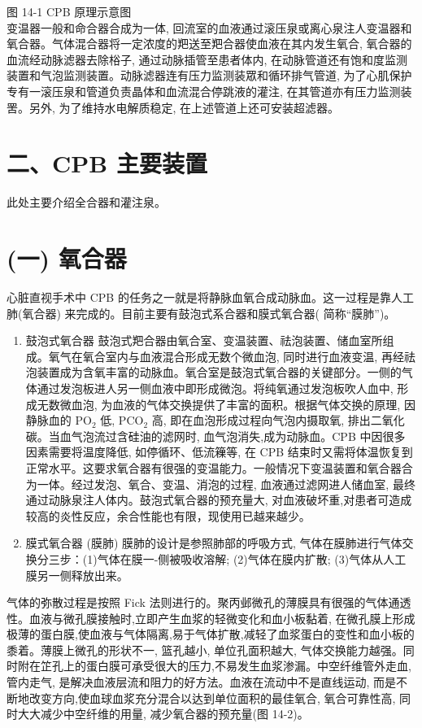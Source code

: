 \documentclass[10pt]{article}
\begin{document}
图 14-1 CPB 原理示意图\\
变温器一般和命合器合成为一体, 回流室的血液通过滚压泉或离心泉注人变温器和氧合器。气体混合器将一定浓度的羓送至羓合器使血液在其内发生氧合, 氧合器的血流经动脉滤器去除㭲子, 通过动脉插管至患者体内, 在动脉管道还有饱和度监测装置和气泡监测装置。动脉滤器连有压力监测装眾和循环排气管道, 为了心肌保护专有一滚压泉和管道负责晶体和血流混合停跳液的灌注, 在其管道亦有压力监测装罟。另外, 为了维持水电解质稳定, 在上述管道上还可安装超滤器。

\section*{二、CPB 主要装置}
此处主要介绍全合器和灌注泉。

\section*{(一) 氧合器}
心脏直视手术中 CPB 的任务之一就是将静脉血氧合成动脉血。这一过程是靠人工肺(氧合器) 来完成的。目前主要有鼓泡式系合器和膜式氧合器( 简称“膜肺”)。

\begin{enumerate}
  \item 鼓泡式氧合器 鼓泡式羓合器由氧合室、变温装置、祛泡装置、储血室所组成。氧气在氧合室内与血液混合形成无数个微血泡, 同时进行血液变温, 再经祛泡装置成为含氧丰富的动脉血。氧合室是鼓泡式氧合器的关键部分。一侧的气体通过发泡板进人另一侧血液中即形成微泡。将纯氧通过发泡板吹人血中, 形成无数微血泡, 为血液的气体交换提供了丰富的面积。根据气体交换的原理, 因静脉血的 $\mathrm{PO}_{2}$ 低, $\mathrm{PCO}_{2}$ 高, 即在血泡形成过程向气泡内摄取氧, 排出二氧化碳。当血气泡流过含硅油的滤网时, 血气泡消失,成为动脉血。CPB 中因很多因素需要将温度降低, 如停循环、低流䉓等, 在 CPB 结束时又需将体温恢复到正常水平。这要求氧合器有很强的变温能力。一般情况下变温装置和氧合器合为一体。经过发泡、氧合、变温、消泡的过程, 血液通过滤网进人储血室, 最终通过动脉泉注人体内。鼓泡式氧合器的预充量大, 对血液破坏重,对患者可造成较高的炎性反应，余合性能也有限，现使用已越来越少。

  \item 膜式氧合器 (膜肺) 膜肺的设计是参照肺部的呼吸方式, 气体在膜肺进行气体交换分三步：(1)气体在膜一-侧被吸收溶解; (2)气体在膜内扩散; (3)气体从人工膜另一侧释放出来。

\end{enumerate}

气体的弥散过程是按照 Fick 法则进行的。聚丙邺微孔的薄膜具有很强的气体通透性。血液与微孔膜接触时,立即产生血浆的轻微变化和血小板黏着, 在微孔膜上形成极薄的蛋白膜,使血液与气体隔离,易于气体扩散,减轻了血浆蛋白的变性和血小板的黍着。薄膜上微孔的形状不一, 篮孔越小, 单位孔面积越大, 气体交换能力越强。同时附在䇛孔上的蛋白膜可承受很大的压力,不易发生血浆渗漏。中空纤维管外走血, 管内走气, 是解决血液层流和阻力的好方法。血液在流动中不是直线运动, 而是不断地改变方向,使血球血浆充分混合以达到单位面积的最佳氧合, 氧合可靠性高, 同时大大减少中空纤维的用量, 减少氧合器的预充量(图 14-2)。
\end{document}
